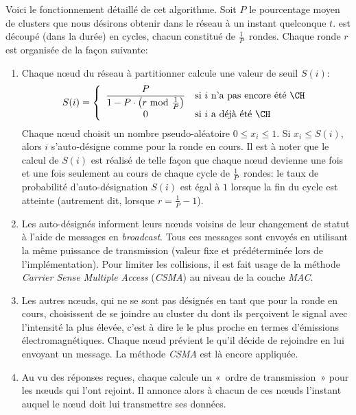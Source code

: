 Voici le fonctionnement détaillé de cet algorithme.
Soit $P$ le pourcentage moyen de clusters que nous désirons obtenir dans le réseau à un instant quelconque $t$.
\leach est découpé (dans la durée) en cycles, chacun constitué de $\frac{1}{P}$~rondes.
Chaque ronde $r$  est organisée de la façon suivante:
\begin{enumerate}
    \item Chaque nœud du réseau à partitionner calcule une valeur de seuil $S(i)$:
        \[
            S(i) = \left\{
            \begin{array}{cl}
                \displaystyle \frac{P}{1-P\cdot\left(r\mbox{ mod }\frac{1}{P}\right)} & \mbox{si }i\mbox{ n'a pas encore été \CH}\\
                                                                                    0 & \mbox{si }i\mbox{ a déjà été \CH}
            \end{array}
            \right.
        \]
        Chaque nœud choisit un nombre pseudo-aléatoire $0 \le x_{i}\le 1$.
        Si $x_{i} \le S(i)$, alors $i$ s'auto-désigne comme \CH pour la ronde en cours.
        Il est à noter que le calcul de $S(i)$ est réalisé de telle façon que chaque nœud devienne \ch une fois et une fois seulement au cours de chaque cycle de $\frac{1}{P}$~rondes: le taux de probabilité d'auto-désignation $S(i)$ est égal à $1$ lorsque la fin du cycle est atteinte (autrement dit, lorsque $r = \frac{1}{P}-1$).
    \item Les \chs auto-désignés informent leurs nœuds voisins de leur changement de statut à l'aide de messages en \textit{broadcast}.
        Tous ces messages sont envoyés en utilisant la même puissance de transmission (valeur fixe et prédéterminée lors de l'implémentation).
        Pour limiter les collisions, il est fait usage de la méthode \textit{Carrier Sense Multiple Access} (\textit{CSMA}) au niveau de la couche \textit{MAC}.
    \item Les autres nœuds, qui ne se sont pas désignés en tant que \chs pour la ronde en cours, choisissent de se joindre au cluster du \CH dont ils perçoivent le signal avec l'intensité la plus élevée, c'est à dire le \CH le plus proche en termes d'émissions électromagnétiques.
        Chaque nœud prévient le \ch qu'il décide de rejoindre en lui envoyant un message.
        La méthode \textit{CSMA} est là encore appliquée.
    \item Au vu des réponses reçues, chaque \ch calcule un «~ordre de transmission~» pour les nœuds qui l'ont rejoint.
        Il annonce alors à chacun de ces nœuds l'instant auquel le nœud doit lui transmettre ses données.

\end{enumerate}
